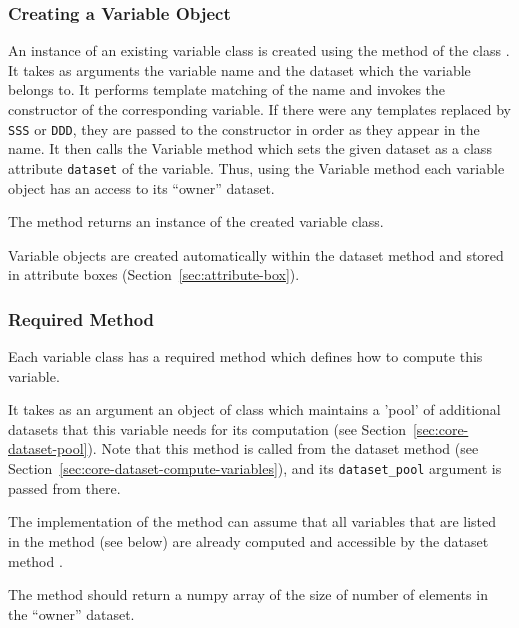 \subsubsection{Creating a Variable Object}
%
An instance of an existing variable class is
created using the method
of the
class .  It takes as arguments
the variable name and the dataset which the variable belongs to. It performs
template matching of the name and invokes the constructor of the corresponding
variable. If there were any templates replaced by \verb|SSS| or \verb|DDD|,
they are passed to the constructor in order as they appear in the name. It
then calls the Variable method  which sets the given
dataset as a class attribute \verb|dataset| of the variable. Thus, using the
Variable method  each variable object has an access to
its ``owner'' dataset. 

The  method  returns an instance
of the created variable class.

Variable objects are created automatically within the dataset method
 and stored in attribute boxes
(Section~\ref{sec:attribute-box}).

\subsubsection{Required Method }
%
Each variable class has a required method  which defines how
to compute this variable.

It takes as an argument an object of class  which
maintains a 'pool' of additional datasets that this variable needs for its computation 
(see Section~\ref{sec:core-dataset-pool}). Note that this method is called from the
dataset method  (see Section~\ref{sec:core-dataset-compute-variables}), 
and its \verb|dataset_pool| argument is passed from there. 

The implementation of the  method can assume that all
variables that are listed in the
 method (see below) are already computed and accessible by the dataset 
method .

The  method should return a numpy array of the size of number
of elements in the ``owner'' dataset. 


